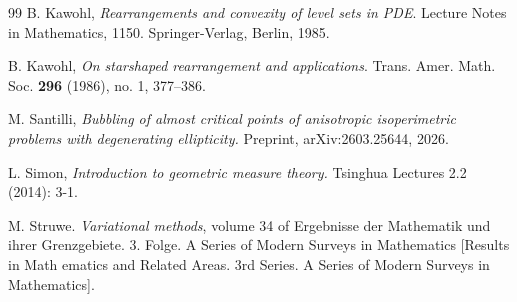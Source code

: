 \documentclass[reqno,11pt]{amsart}
\numberwithin{equation}{section}
\theoremstyle{remark}
\begin{document}
\begin{thebibliography}{99}
B. Kawohl,  \emph{Rearrangements and convexity of level sets in PDE}. Lecture Notes in Mathematics, 1150. Springer-Verlag, Berlin, 1985.

B. Kawohl, 
 \emph{On starshaped rearrangement and applications}.
Trans. Amer. Math. Soc. \textbf{296} (1986), no. 1, 377--386.

M. Santilli,
\emph{Bubbling of almost critical points of anisotropic isoperimetric problems with degenerating ellipticity.}
Preprint, arXiv:2603.25644, 2026.

L. Simon, \emph{Introduction to geometric measure theory.} Tsinghua Lectures 2.2 (2014): 3-1.


M. Struwe. \emph{Variational methods}, volume 34 of Ergebnisse der Mathematik und ihrer Grenzgebiete. 3. Folge. A Series of Modern Surveys in Mathematics [Results in Math
ematics and Related Areas. 3rd Series. A Series of Modern Surveys in Mathematics].
 


\end{thebibliography}
\end{document}
